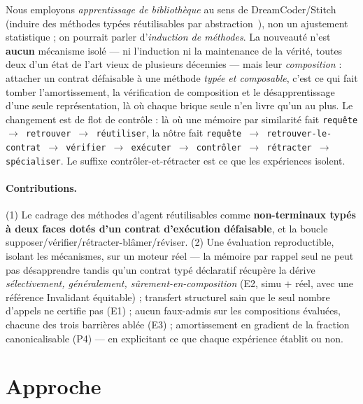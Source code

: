 \documentclass[11pt]{article}
\begin{document}
Nous employons \emph{apprentissage de bibliothèque} au sens de DreamCoder/Stitch~\cite{ellis2021,bowers2023}
(induire des méthodes typées réutilisables par abstraction~\cite{plotkin1970}), non un ajustement statistique ; on
pourrait parler d'\emph{induction de méthodes}. La nouveauté n'est \textbf{aucun} mécanisme isolé --- ni l'induction
ni la maintenance de la vérité, toutes deux d'un état de l'art vieux de plusieurs décennies --- mais leur
\emph{composition} : attacher un contrat défaisable à une méthode \emph{typée et composable}, c'est ce qui fait
tomber l'amortissement, la vérification de composition et le désapprentissage d'une seule représentation, là où
chaque brique seule n'en livre qu'un au plus. Le changement est de flot de contrôle : là où
une mémoire par similarité fait \texttt{requête $\to$ retrouver $\to$ réutiliser}, la nôtre fait
\texttt{requête $\to$ retrouver-le-contrat $\to$ vérifier $\to$ exécuter $\to$ contrôler $\to$ rétracter $\to$
spécialiser}. Le suffixe contrôler-et-rétracter est ce que les expériences isolent.

\paragraph{Contributions.} (1) Le cadrage des méthodes d'agent réutilisables comme \textbf{non-terminaux typés à
deux faces dotés d'un contrat d'exécution défaisable}, et la boucle supposer/vérifier/rétracter-blâmer/réviser. (2)
Une évaluation reproductible, isolant les mécanismes, sur un moteur réel --- la mémoire par rappel seul ne peut pas
désapprendre tandis qu'un contrat typé déclaratif récupère la dérive \emph{sélectivement, généralement,
sûrement-en-composition} (E2, simu + réel, avec une référence Invalidant équitable) ; transfert structurel sain que
le seul nombre d'appels ne certifie pas (E1) ; aucun faux-admis sur les compositions évaluées, chacune des trois
barrières ablée (E3) ; amortissement en gradient de la fraction canonicalisable (P4) --- en explicitant ce que
chaque expérience établit ou non.

\section{Approche}
\end{document}
